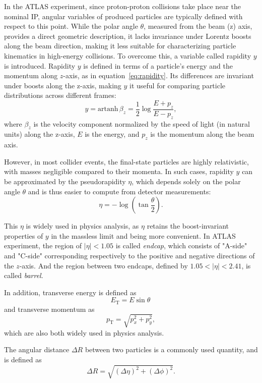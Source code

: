 In the ATLAS experiment, since proton-proton collisions take place near the nominal IP, angular variables of produced particles are typically defined with respect to this point. While the polar angle \(\theta\), measured from the beam (z) axis, provides a direct geometric description, it lacks invariance under Lorentz boosts along the beam direction, making it less suitable for characterizing particle kinematics in high-energy collisions.
To overcome this, a variable called rapidity \(y\) is introduced. Rapidity \(y\) is defined in terms of a particle's energy and the momentum along \(z\)-axis, as in equation~\ref{eq:rapidity}. Its differences are invariant under boosts along the z-axis, making \(y\) it useful for comparing particle distributions across different frames:
\begin{equation}
  y = \mathrm{artanh}\, \beta_z = \frac{1}{2} \log \frac{E + p_z}{E - p_z},
  \label{eq:rapidity}
\end{equation}
where \(\beta_z\) is the velocity component normalized by the speed of light (in natural units) along the z-axis, \(E\) is the energy, and \(p_z\) is the momentum along the beam axis.

However, in most collider events, the final-state particles are highly relativistic, with masses negligible compared to their momenta. In such cases, rapidity \(y\) can be approximated by the pseudorapidity \(\eta\), which depends solely on the polar angle \(\theta\) and is thus easier to compute from detector measurements:
\begin{equation}
  \eta = -\log\left( \tan \frac{\theta}{2} \right).
  \label{eq:pseudorapidity}
\end{equation}

This \(\eta\) is widely used in physics analysis, as \(\eta\) retains the boost-invariant properties of \(y\) in the massless limit and being more convenient. In ATLAS experiment, the region of $|\eta| < 1.05$ is called \textit{endcap}, which consists of "A-side" and "C-side" corresponding respectively to the positive and negative directions of the \(z\)-axis. And the region between two endcaps, defined by $1.05 < |\eta| < 2.41$, is called \textit{barrel}.

In addition, transverse energy is defined as 
\[
  E_{\mathrm{T}} = E \sin \theta\,
\]
and transverse momentum as
\[
  p_{\mathrm{T}} = \sqrt{p_x^2 + p_y^2},
\]
which are also both widely used in physics analysis.

The angular distance \(\Delta R\) between two particles is a commonly used quantity, and is defined as
\begin{equation}
  \Delta R = \sqrt{(\Delta \eta)^2 + (\Delta \phi)^2}.
  \label{eq:deltaR}
\end{equation}
